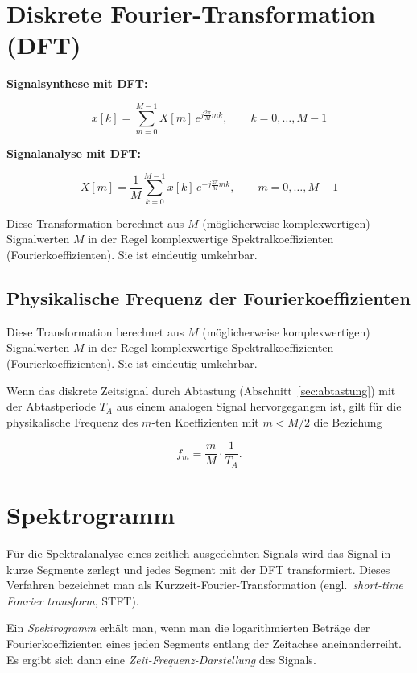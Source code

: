 \section{Diskrete Fourier-Transformation (DFT)}
\label{sec:dft}

\begin{definition}
\textbf{Signalsynthese mit DFT:}

$$
x[k] = \sum_{m=0}^{M-1} X[m]\, e^{j\frac{2\pi}{M}mk}, \qquad k = 0, \ldots, M-1
$$

\textbf{Signalanalyse mit DFT:}

$$
X[m] = \frac{1}{M} \sum_{k=0}^{M-1} x[k]\, e^{-j\frac{2\pi}{M}mk}, \qquad m = 0, \ldots, M-1
$$

Diese Transformation berechnet aus $M$ (möglicherweise komplexwertigen) Signalwerten $M$ in der Regel komplexwertige Spektralkoeffizienten (Fourierkoeffizienten). Sie ist eindeutig umkehrbar.
\end{definition}

\subsection*{Physikalische Frequenz der Fourierkoeffizienten}

Diese Transformation berechnet aus $M$ (möglicherweise komplexwertigen) Signalwerten $M$ in der Regel komplexwertige Spektralkoeffizienten (Fourierkoeffizienten). Sie ist eindeutig umkehrbar.

Wenn das diskrete Zeitsignal durch Abtastung (Abschnitt~\ref{sec:abtastung}) mit der Abtastperiode $T_A$ aus einem analogen Signal hervorgegangen ist, gilt für die physikalische Frequenz des $m$-ten Koeffizienten mit $m < M/2$ die Beziehung

$$
f_m = \frac{m}{M} \cdot \frac{1}{T_A}.
$$

\section{Spektrogramm}
\label{sec:spektrogramm}

Für die Spektralanalyse eines zeitlich ausgedehnten Signals wird das Signal in kurze Segmente zerlegt und jedes Segment mit der DFT transformiert. Dieses Verfahren bezeichnet man als Kurzzeit-Fourier-Transformation (engl.\ \textit{short-time Fourier transform}, STFT).

Ein \textit{Spektrogramm} erhält man, wenn man die logarithmierten Beträge der Fourierkoeffizienten eines jeden Segments entlang der Zeitachse aneinanderreiht. Es ergibt sich dann eine \textit{Zeit-Frequenz-Darstellung} des Signals.
